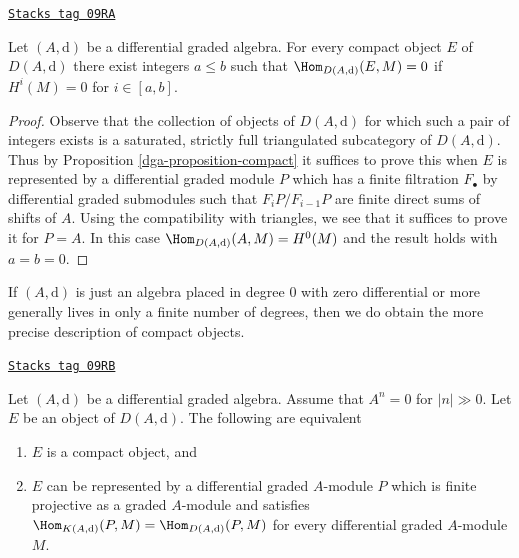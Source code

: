 \begin{lemma}
\label{dga-lemma-compact-implies-bounded}
\href{https://stacks.math.columbia.edu/tag/09RA}{\texttt{Stacks tag 09RA}}

Let $(A, \text{d})$ be a differential graded algebra.
For every compact object $E$ of $D(A, \text{d})$ there
exist integers $a \leq b$ such that $\Hom_{D(A, \text{d})}(E, M) = 0$
if $H^i(M) = 0$ for $i \in [a, b]$.
\end{lemma}

\begin{proof}

Observe that the collection of objects of $D(A, \text{d})$ for which
such a pair of integers exists is a saturated, strictly full triangulated
subcategory of $D(A, \text{d})$.
Thus by Proposition \ref{dga-proposition-compact} it suffices to prove
this when $E$ is represented by a differential graded module $P$ which
has a finite filtration $F_\bullet$ by differential graded submodules
such that $F_iP/F_{i - 1}P$ are finite direct sums of shifts of $A$.
Using the compatibility with triangles, we see that it suffices
to prove it for $P = A$. In this case $\Hom_{D(A, \text{d})}(A, M) = H^0(M)$
and the result holds with $a = b = 0$.
\end{proof}

If $(A, \text{d})$ is just an algebra placed in degree $0$
with zero differential or more generally lives in
only a finite number of degrees, then we do obtain the
more precise description of compact objects.

\begin{lemma}[Compact]
\label{dga-lemma-compact}
\href{https://stacks.math.columbia.edu/tag/09RB}{\texttt{Stacks tag 09RB}}

Let $(A, \text{d})$ be a differential graded algebra. Assume that $A^n = 0$
for $|n| \gg 0$. Let $E$ be an object of $D(A, \text{d})$.
The following are equivalent
\begin{enumerate}
\item $E$ is a compact object, and
\item $E$ can be represented by a differential graded $A$-module $P$
which is finite projective as a graded $A$-module and satisfies
$\Hom_{K(A, \text{d})}(P, M) = \Hom_{D(A, \text{d})}(P, M)$
for every differential graded $A$-module $M$.
\end{enumerate}
\end{lemma}

